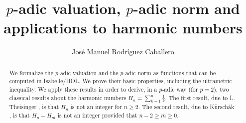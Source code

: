 \documentclass[11pt,a4paper]{article}
\begin{document}
\title{$p$-adic valuation, $p$-adic norm and applications to harmonic numbers}
\author{Jos\'e Manuel Rodr\'iguez Caballero}
\maketitle

\begin{abstract}
We formalize the $p$-adic valuation and the $p$-adic norm as functions that can be computed in Isabelle/HOL. We prove their basic properties, including the ultrametric inequality. We apply these results in order to derive, in a $p$-adic way (for $p = 2$), two classical results about the harmonic numbers $H_n = \sum_{k = 1}^n \frac{1}{k}$. The first result, due to L. Theisinger \cite{theisinger1915bemerkung}, is that $H_n$ is not an integer for $n \geq 2$. The second result, due to K{\"u}rsch{\'a}k \cite{kurschak1918harmonic}, is that $H_n - H_m$ is not an integer provided that $n-2 \geq m \geq 0$.
\end{abstract}

\tableofcontents






\end{document}
